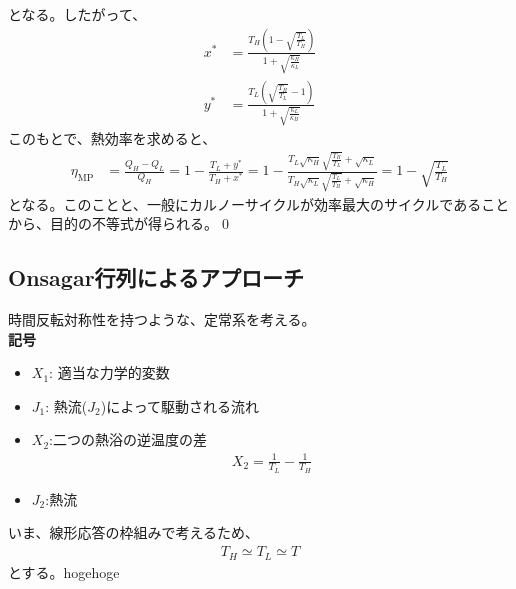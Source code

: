 \documentclass[a4paper,11pt]{jsarticle}
\numberwithin{equation}{section}
\begin{document}
となる。したがって、
\begin{align}
  x^* &= \frac{T_H \left(1 - \sqrt{\frac{T_L}{T_H}} \right)}{1 + \sqrt{\frac{\kappa_H}{\kappa_L}}}\\
  y^* &= \frac{T_L \left(\sqrt{\frac{T_H}{T_L}} - 1\right)}{1 + \sqrt{\frac{\kappa_L}{\kappa_H}}}
\end{align}
このもとで、熱効率を求めると、
\begin{align}
  \eta_{\text{MP}} &= \frac{Q_H - Q_L}{Q_H} = 1 - \frac{T_L + y^*}{T_H + x^*} = 1 - \frac{T_L \sqrt{\kappa_H} \sqrt{\frac{T_H}{T_L}} + \sqrt{\kappa_L}}{T_H \sqrt{\kappa_L} \sqrt{\frac{T_L}{T_H}} + \sqrt{\kappa_H}} = 1 - \sqrt{\frac{T_L}{T_H}}
\end{align}
となる。このことと、一般にカルノーサイクルが効率最大のサイクルであることから、目的の不等式が得られる。\qed\\

\subsection{Onsagar行列によるアプローチ}
時間反転対称性を持つような、定常系を考える。\\
\textbf{記号}\\
\begin{itemize}
  \item $X_{1}$: 適当な力学的変数
  \item $J_{1}$: 熱流($J_{2}$)によって駆動される流れ
  \item $X_{2}$:二つの熱浴の逆温度の差
  \begin{align}
    X_{2} = \frac{1}{T_{L}} - \frac{1}{T_{H}}
  \end{align}
  \item $J_{2}$:熱流
\end{itemize}
いま、線形応答の枠組みで考えるため、
\begin{align}
  T_{H} \simeq T_{L} \simeq T
\end{align}
とする。hogehoge%
\end{document}
